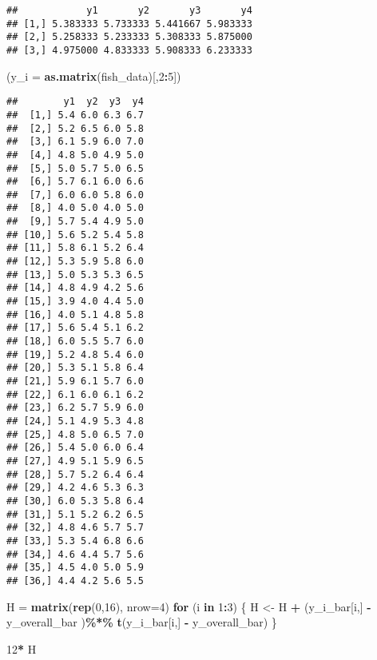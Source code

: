 \documentclass[
]{article}
\newenvironment{Shaded}{\begin{snugshade}}{\end{snugshade}}
\newcommand{\AttributeTok}[1]{\textcolor[rgb]{0.13,0.29,0.53}{#1}}
\newcommand{\ControlFlowTok}[1]{\textcolor[rgb]{0.13,0.29,0.53}{\textbf{#1}}}
\newcommand{\DecValTok}[1]{\textcolor[rgb]{0.00,0.00,0.81}{#1}}
\newcommand{\FunctionTok}[1]{\textcolor[rgb]{0.13,0.29,0.53}{\textbf{#1}}}
\newcommand{\NormalTok}[1]{#1}
\newcommand{\OtherTok}[1]{\textcolor[rgb]{0.56,0.35,0.01}{#1}}
\newcommand{\SpecialCharTok}[1]{\textcolor[rgb]{0.81,0.36,0.00}{\textbf{#1}}}
\begin{document}
\begin{verbatim}
##            y1       y2       y3       y4
## [1,] 5.383333 5.733333 5.441667 5.983333
## [2,] 5.258333 5.233333 5.308333 5.875000
## [3,] 4.975000 4.833333 5.908333 6.233333
\end{verbatim}

\begin{Shaded}
\begin{Highlighting}[]
\NormalTok{(}\AttributeTok{y\_i =} \FunctionTok{as.matrix}\NormalTok{(fish\_data)[,}\DecValTok{2}\SpecialCharTok{:}\DecValTok{5}\NormalTok{])}
\end{Highlighting}
\end{Shaded}

\begin{verbatim}
##        y1  y2  y3  y4
##  [1,] 5.4 6.0 6.3 6.7
##  [2,] 5.2 6.5 6.0 5.8
##  [3,] 6.1 5.9 6.0 7.0
##  [4,] 4.8 5.0 4.9 5.0
##  [5,] 5.0 5.7 5.0 6.5
##  [6,] 5.7 6.1 6.0 6.6
##  [7,] 6.0 6.0 5.8 6.0
##  [8,] 4.0 5.0 4.0 5.0
##  [9,] 5.7 5.4 4.9 5.0
## [10,] 5.6 5.2 5.4 5.8
## [11,] 5.8 6.1 5.2 6.4
## [12,] 5.3 5.9 5.8 6.0
## [13,] 5.0 5.3 5.3 6.5
## [14,] 4.8 4.9 4.2 5.6
## [15,] 3.9 4.0 4.4 5.0
## [16,] 4.0 5.1 4.8 5.8
## [17,] 5.6 5.4 5.1 6.2
## [18,] 6.0 5.5 5.7 6.0
## [19,] 5.2 4.8 5.4 6.0
## [20,] 5.3 5.1 5.8 6.4
## [21,] 5.9 6.1 5.7 6.0
## [22,] 6.1 6.0 6.1 6.2
## [23,] 6.2 5.7 5.9 6.0
## [24,] 5.1 4.9 5.3 4.8
## [25,] 4.8 5.0 6.5 7.0
## [26,] 5.4 5.0 6.0 6.4
## [27,] 4.9 5.1 5.9 6.5
## [28,] 5.7 5.2 6.4 6.4
## [29,] 4.2 4.6 5.3 6.3
## [30,] 6.0 5.3 5.8 6.4
## [31,] 5.1 5.2 6.2 6.5
## [32,] 4.8 4.6 5.7 5.7
## [33,] 5.3 5.4 6.8 6.6
## [34,] 4.6 4.4 5.7 5.6
## [35,] 4.5 4.0 5.0 5.9
## [36,] 4.4 4.2 5.6 5.5
\end{verbatim}

\begin{Shaded}
\begin{Highlighting}[]
\NormalTok{H }\OtherTok{=} \FunctionTok{matrix}\NormalTok{(}\FunctionTok{rep}\NormalTok{(}\DecValTok{0}\NormalTok{,}\DecValTok{16}\NormalTok{), }\AttributeTok{nrow=}\DecValTok{4}\NormalTok{)}
\ControlFlowTok{for}\NormalTok{ (i }\ControlFlowTok{in} \DecValTok{1}\SpecialCharTok{:}\DecValTok{3}\NormalTok{) \{}
\NormalTok{H }\OtherTok{\textless{}{-}}\NormalTok{ H }\SpecialCharTok{+}\NormalTok{ (y\_i\_bar[i,] }\SpecialCharTok{{-}}\NormalTok{ y\_overall\_bar )}\SpecialCharTok{\%*\%} \FunctionTok{t}\NormalTok{(y\_i\_bar[i,] }\SpecialCharTok{{-}}\NormalTok{ y\_overall\_bar)}
\NormalTok{\}}

\DecValTok{12}\SpecialCharTok{*}\NormalTok{ H}
\end{Highlighting}
\end{Shaded}
\end{document}
